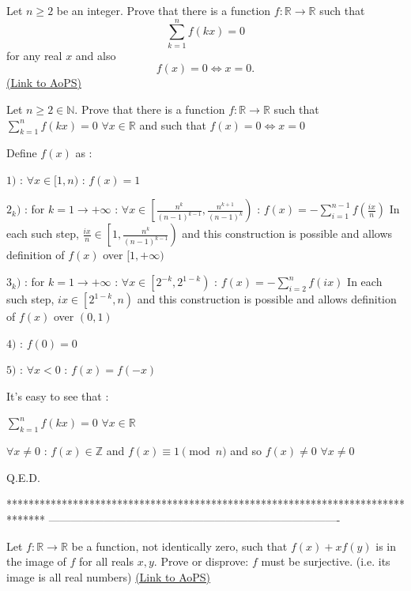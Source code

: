 \begin{problem}
	Let $n\ge 2$ be an integer. Prove that there is a function $f:\mathbb R \to \mathbb R$ such that \[\sum_{k=1}^nf(kx)=0\] for any real $x$ and also \[f(x) =0\iff x=0.\]
	\flushright \href{https://artofproblemsolving.com/community/c6h447299}{(Link to AoPS)}
\end{problem}



\begin{solution}
	\begin{tcolorbox}Let $n\ge 2\in\mathbb N$. Prove that there is a function $f:\mathbb R \to \mathbb R$ such that $\sum_{k=1}^nf(kx)=0$ $\forall x\in\mathbb R$ and such that $f(x) =0\iff x=0$\end{tcolorbox}
Define $f(x)$ as :

$1)$ : $\forall x\in[1,n)$ : $f(x)=1$

$2_k)$ :  for $k=1\to+\infty$ : $\forall x\in \left[\frac{n^k}{(n-1)^{k-1}},\frac {n^{k+1}}{(n-1)^k}\right)$ : $f(x)=-\sum_{i=1}^{n-1}f(\frac{ix}n)$
In each such step, $\frac{ix}n\in\left[1,\frac{n^k}{(n-1)^{k-1}}\right)$ and this construction is possible and allows definition of $f(x)$ over $[1,+\infty)$

$3_k)$ : for $k=1\to+\infty$ : $\forall x\in\left[2^{-k},2^{1-k}\right)$ : $f(x)=-\sum_{i=2}^{n}f(ix)$
In each such step, $ix\in\left[2^{1-k},n\right)$ and this construction is possible and allows definition of $f(x)$ over $(0,1)$

$4)$ : $f(0)=0$

$5)$ : $\forall x<0$ : $f(x)=f(-x)$

It's easy to see that :

$\sum_{k=1}^{n}f(kx)=0$ $\forall x\in\mathbb R$

$\forall x\ne 0$ : $f(x)\in\mathbb Z$ and $f(x)\equiv 1\pmod n$ and so $f(x)\ne 0$ $\forall x\ne 0$

Q.E.D.
\end{solution}
*******************************************************************************
-------------------------------------------------------------------------------

\begin{problem}
	Let $f : \mathbb R \to \mathbb R$ be a function, not identically zero, such that $f(x) + xf(y)$ is in the image of $f$ for all reals $x,y$. Prove or disprove: $f$ must be surjective. (i.e. its image is all real numbers)
	\flushright \href{https://artofproblemsolving.com/community/c6h447675}{(Link to AoPS)}
\end{problem}



